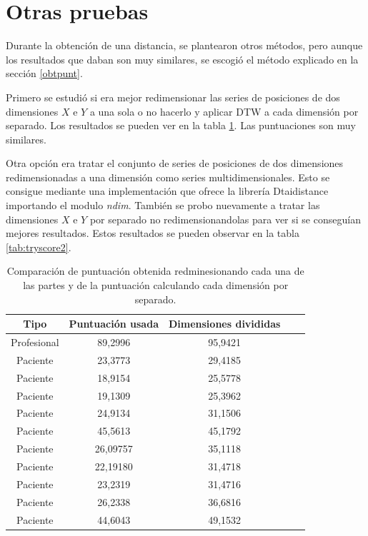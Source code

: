 \label{obtpunt}

\section{Otras pruebas}
Durante la obtención de una distancia, se plantearon otros métodos, pero aunque los resultados que daban son muy similares, se escogió el método explicado en la sección \ref{obtpunt}.

Primero se estudió si era mejor redimensionar las series de posiciones de dos dimensiones $X$ e $Y$ a una sola o no hacerlo y aplicar DTW a cada dimensión por separado. Los resultados se pueden ver en la tabla \ref{tab:tryscore1}. Las puntuaciones son muy similares.

Otra opción era tratar el conjunto de series de posiciones de dos dimensiones redimensionadas a una dimensión como series multidimensionales. Esto se consigue mediante una implementación que ofrece la librería Dtaidistance importando el modulo \textit{ndim}. También se probo nuevamente a tratar las dimensiones $X$ e $Y$ por separado no redimensionandolas para ver si se conseguían mejores resultados. Estos resultados se pueden observar en la tabla \ref{tab:tryscore2}.

\begin{table}
	\centering
		\begin{tabular}{|c|c|c|c|c|}
			\hline
			   \textbf{Tipo}     & \textbf{Puntuación usada} & \textbf{Dimensiones divididas} \\ \hline
			 Profesional &       89,2996  & 95,9421   \\ \hline
			 Paciente &       23,3773  &  29,4185   \\ \hline
			 Paciente &       18,9154  & 25,5778   \\ \hline
			 Paciente   &       19,1309  & 25,3962   \\ \hline
			 Paciente   &       24,9134  & 31,1506   \\ \hline
			 Paciente   &       45,5613  &  45,1792   \\ \hline
			 Paciente   &       26,09757  &  35,1118   \\ \hline
			 Paciente   &       22,19180 &  31,4718   \\ \hline
			 Paciente   &       23,2319  & 31,4716   \\ \hline
			 Paciente   &		26,2338  & 36,6816 \\ \hline
			 Paciente   &		44,6043  & 49,1532 \\ \hline

		\end{tabular}
	\caption{Comparación de puntuación obtenida redminesionando cada una de las partes y de la puntuación calculando cada dimensión por separado.}
	\label{tab:tryscore1}
\end{table}

